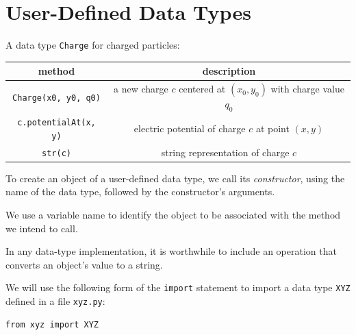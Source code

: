 \documentclass[8pt,a4paper,compress,handout]{beamer}
\begin{document}
\section{User-Defined Data Types}
\begin{frame}[fragile]
A data type \lstinline{Charge} for charged particles:
\begin{center}
\begin{tabular}{cc}
method & description \\ \hline
\lstinline$Charge(x0, y0, q0)$ & a new charge $c$ centered at $(x_0, y_0)$ with charge value $q_0$ \\
\lstinline$c.potentialAt(x, y)$ & electric potential of charge $c$ at point $(x, y)$ \\
\lstinline$str(c)$ & string representation of charge $c$
\end{tabular} 
\end{center}

\bigskip

To create an object of a user-defined data type, we call its \emph{constructor}, using the name of the data type, followed by the constructor's arguments.

\bigskip

We use a variable name to identify the object to be associated with the method we intend to call.

\bigskip

In any data-type implementation, it is worthwhile to include an operation that converts an object's value to a string.

\bigskip

We will use the following form of the \lstinline{import} statement to import a data type \lstinline{XYZ} defined in a file \lstinline{xyz.py}:
\begin{lstlisting}[language={}]
from xyz import XYZ
\end{lstlisting}
\end{frame}
\end{document}
